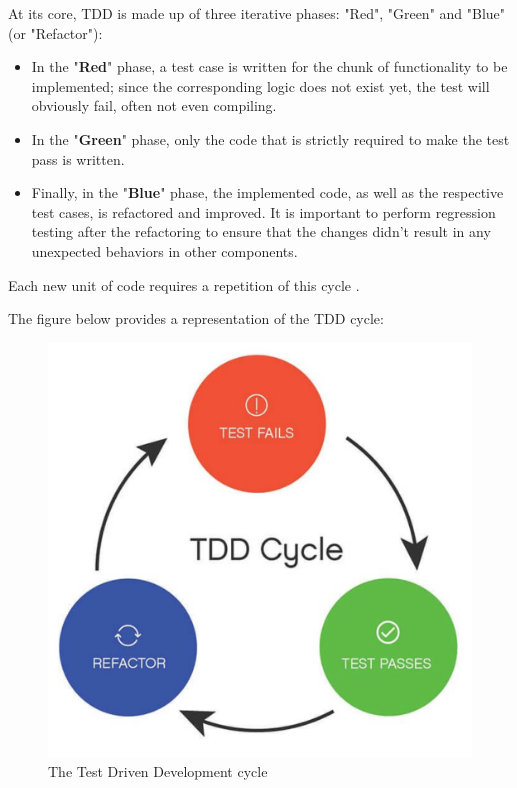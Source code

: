 At its core, TDD is made up of three iterative phases: "Red", "Green" and "Blue" (or "Refactor"):
\begin{itemize}
    \item In the "\textbf{Red}" phase, a test case is written for the chunk of functionality to be implemented; since the corresponding logic does not exist yet, the test will obviously fail, often not even compiling.
    \item In the "\textbf{Green}" phase, only the code that is strictly required to make the test pass is written.
    \item Finally, in the "\textbf{Blue}" phase, the implemented code, as well as the respective test cases, is refactored and improved. It is important to perform regression testing after the refactoring to ensure that the changes didn't result in any unexpected behaviors in other components.
\end{itemize}
Each new unit of code requires a repetition of this cycle \cite{GuidelinesTDD}.

The figure below provides a representation of the TDD cycle:
\begin{figure}[h]
    \centering
    \includegraphics[width=\linewidth]{figures/tdd_cycle.jpg}
    \caption{The Test Driven Development cycle}
    \label{fig}
\end{figure}

